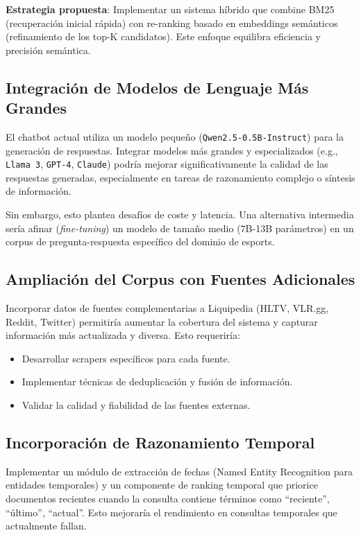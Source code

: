 \textbf{Estrategia propuesta}: Implementar un sistema híbrido que combine BM25 (recuperación inicial rápida) con re-ranking basado en embeddings semánticos (refinamiento de los top-K candidatos). Este enfoque equilibra eficiencia y precisión semántica.

\subsection{Integración de Modelos de Lenguaje Más Grandes}

El chatbot actual utiliza un modelo pequeño (\texttt{Qwen2.5-0.5B-Instruct}) para la generación de respuestas. Integrar modelos más grandes y especializados (e.g., \texttt{Llama 3}, \texttt{GPT-4}, \texttt{Claude}) podría mejorar significativamente la calidad de las respuestas generadas, especialmente en tareas de razonamiento complejo o síntesis de información.

Sin embargo, esto plantea desafíos de coste y latencia. Una alternativa intermedia sería afinar (\textit{fine-tuning}) un modelo de tamaño medio (7B-13B parámetros) en un corpus de pregunta-respuesta específico del dominio de esports.

\subsection{Ampliación del Corpus con Fuentes Adicionales}

Incorporar datos de fuentes complementarias a Liquipedia (HLTV, VLR.gg, Reddit, Twitter) permitiría aumentar la cobertura del sistema y capturar información más actualizada y diversa. Esto requeriría:
\begin{itemize}
    \item Desarrollar scrapers específicos para cada fuente.
    \item Implementar técnicas de deduplicación y fusión de información.
    \item Validar la calidad y fiabilidad de las fuentes externas.
\end{itemize}

\subsection{Incorporación de Razonamiento Temporal}

Implementar un módulo de extracción de fechas (Named Entity Recognition para entidades temporales) y un componente de ranking temporal que priorice documentos recientes cuando la consulta contiene términos como \enquote{reciente}, \enquote{último}, \enquote{actual}. Esto mejoraría el rendimiento en consultas temporales que actualmente fallan.

